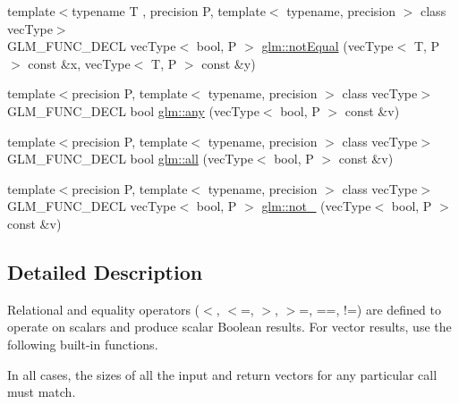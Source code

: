 \begin{DoxyCompactItemize}
\item 
{\footnotesize template$<$typename T , precision P, template$<$ typename, precision $>$ class vec\-Type$>$ }\\G\-L\-M\-\_\-\-F\-U\-N\-C\-\_\-\-D\-E\-C\-L vec\-Type$<$ bool, P $>$ \hyperlink{group__core__func__vector__relational_ga5aca2b745e5eb0096716bbc394846309}{glm\-::not\-Equal} (vec\-Type$<$ T, P $>$ const \&x, vec\-Type$<$ T, P $>$ const \&y)
\item 
{\footnotesize template$<$precision P, template$<$ typename, precision $>$ class vec\-Type$>$ }\\G\-L\-M\-\_\-\-F\-U\-N\-C\-\_\-\-D\-E\-C\-L bool \hyperlink{group__core__func__vector__relational_ga632a2644532d9332011c8860400d30b2}{glm\-::any} (vec\-Type$<$ bool, P $>$ const \&v)
\item 
{\footnotesize template$<$precision P, template$<$ typename, precision $>$ class vec\-Type$>$ }\\G\-L\-M\-\_\-\-F\-U\-N\-C\-\_\-\-D\-E\-C\-L bool \hyperlink{group__core__func__vector__relational_ga14bbc94f2ae2774a1d64d91f8767773e}{glm\-::all} (vec\-Type$<$ bool, P $>$ const \&v)
\item 
{\footnotesize template$<$precision P, template$<$ typename, precision $>$ class vec\-Type$>$ }\\G\-L\-M\-\_\-\-F\-U\-N\-C\-\_\-\-D\-E\-C\-L vec\-Type$<$ bool, P $>$ \hyperlink{group__core__func__vector__relational_ga4329ecbc2ef012c9ec704bd09da1f177}{glm\-::not\-\_\-} (vec\-Type$<$ bool, P $>$ const \&v)
\end{DoxyCompactItemize}


\subsection{Detailed Description}
Relational and equality operators ($<$, $<$=, $>$, $>$=, ==, !=) are defined to operate on scalars and produce scalar Boolean results. For vector results, use the following built-\/in functions.

In all cases, the sizes of all the input and return vectors for any particular call must match. 

